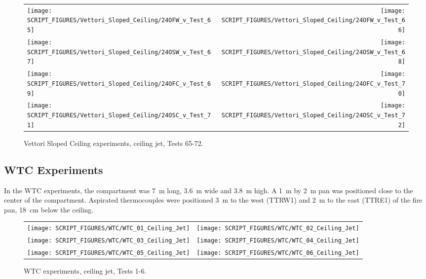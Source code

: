 \begin{figure}[p]
\begin{tabular*}{\textwidth}{l@{\extracolsep{\fill}}r}
\texttt{[image: SCRIPT\_FIGURES/Vettori\_Sloped\_Ceiling/24OFW\_v\_Test\_65]} &
\texttt{[image: SCRIPT\_FIGURES/Vettori\_Sloped\_Ceiling/24OFW\_v\_Test\_66]} \\
\texttt{[image: SCRIPT\_FIGURES/Vettori\_Sloped\_Ceiling/24OSW\_v\_Test\_67]} &
\texttt{[image: SCRIPT\_FIGURES/Vettori\_Sloped\_Ceiling/24OSW\_v\_Test\_68]} \\
\texttt{[image: SCRIPT\_FIGURES/Vettori\_Sloped\_Ceiling/24OFC\_v\_Test\_69]} &
\texttt{[image: SCRIPT\_FIGURES/Vettori\_Sloped\_Ceiling/24OFC\_v\_Test\_70]} \\
\texttt{[image: SCRIPT\_FIGURES/Vettori\_Sloped\_Ceiling/24OSC\_v\_Test\_71]} &
\texttt{[image: SCRIPT\_FIGURES/Vettori\_Sloped\_Ceiling/24OSC\_v\_Test\_72]} \\
\end{tabular*}
\caption[Vettori Sloped Ceiling experiments, ceiling jet, Tests 65-72]{Vettori Sloped Ceiling experiments, ceiling jet, Tests 65-72.}
\label{Vettori_Sloped_9}
\end{figure}

\clearpage




\subsection{WTC Experiments}

In the WTC experiments, the compartment was 7~m long, 3.6~m wide and 3.8~m high. A 1~m by 2~m pan was positioned close to the center of the compartment. Aspirated thermocouples were positioned 3~m to the west (TTRW1) and 2~m to the east (TTRE1) of the fire pan, 18~cm below the ceiling.


\begin{figure}[h!]
\begin{tabular*}{\textwidth}{l@{\extracolsep{\fill}}r}
\texttt{[image: SCRIPT\_FIGURES/WTC/WTC\_01\_Ceiling\_Jet]} &
\texttt{[image: SCRIPT\_FIGURES/WTC/WTC\_02\_Ceiling\_Jet]} \\
\texttt{[image: SCRIPT\_FIGURES/WTC/WTC\_03\_Ceiling\_Jet]} &
\texttt{[image: SCRIPT\_FIGURES/WTC/WTC\_04\_Ceiling\_Jet]} \\
\texttt{[image: SCRIPT\_FIGURES/WTC/WTC\_05\_Ceiling\_Jet]} &
\texttt{[image: SCRIPT\_FIGURES/WTC/WTC\_06\_Ceiling\_Jet]}
\end{tabular*}
\caption[WTC experiments, ceiling jet, Tests 1-6]{WTC experiments, ceiling jet, Tests 1-6.}
\label{WTC_Jet}
\end{figure}

